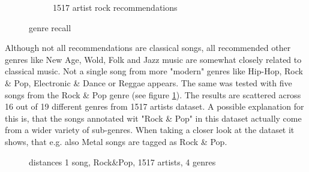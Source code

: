 \begin{figure}[htbp]
{{\begin{subfigure}{.495\textwidth}
				\caption{1517 artist rock recommendations}
				\label{fig:genrerec2}
			\end{subfigure}		
	}}
	\caption{genre recall}
	\label{fig:1517gen}
\end{figure}

\noindent Although not all recommendations are classical songs, all recommended other genres like New Age, Wold, Folk and Jazz music are somewhat closely related to classical music.  Not a single song from more "modern" genres like Hip-Hop, Rock \& Pop, Electronic \& Dance or Reggae appears.
\noindent The same was tested with five songs from the Rock \& Pop genre (see figure \ref{fig:genrerec2}). The results are scattered across 16 out of 19 different genres from 1517 artists dataset. A possible explanation for this is, that the songs annotated wit "Rock \& Pop" in this dataset actually come from a wider variety of sub-genres. When taking a closer look at the dataset it shows, that e.g. also Metal songs are tagged as Rock \& Pop.\\
\begin{figure}[htbp]
	\centering
	\caption{distances 1 song, Rock\&Pop, 1517 artists, 4 genres}
	\label{fig:corr5}
\end{figure}
\FloatBarrier

